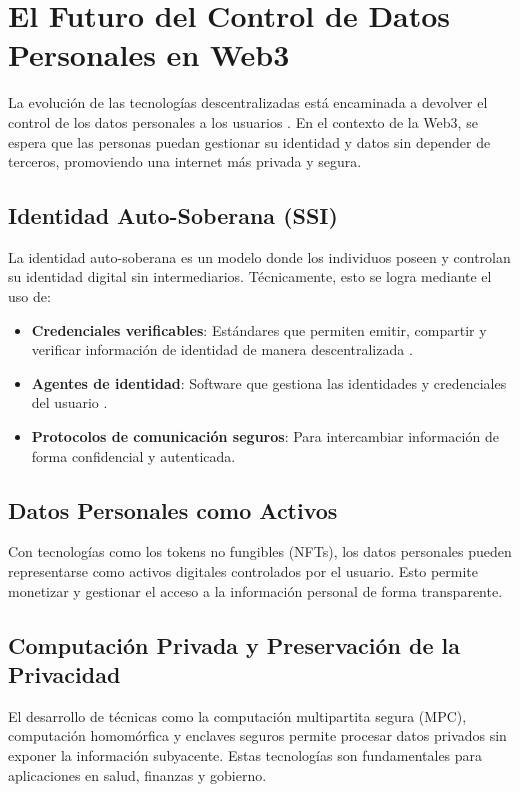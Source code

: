 \section{El Futuro del Control de Datos Personales en Web3}

La evolución de las tecnologías descentralizadas está encaminada a devolver el control de los datos personales a los usuarios \cite{w3cverifiable}. En el contexto de la Web3, se espera que las personas puedan gestionar su identidad y datos sin depender de terceros, promoviendo una internet más privada y segura.

\subsection{Identidad Auto-Soberana (SSI)}

La identidad auto-soberana es un modelo donde los individuos poseen y controlan su identidad digital sin intermediarios. Técnicamente, esto se logra mediante el uso de:

\begin{itemize}
    \item \textbf{Credenciales verificables}: Estándares que permiten emitir, compartir y verificar información de identidad de manera descentralizada \cite{w3cverifiable}.
    \item \textbf{Agentes de identidad}: Software que gestiona las identidades y credenciales del usuario \cite{preukschat2020self}.
    \item \textbf{Protocolos de comunicación seguros}: Para intercambiar información de forma confidencial y autenticada.
\end{itemize}

\subsection{Datos Personales como Activos}

Con tecnologías como los tokens no fungibles (NFTs), los datos personales pueden representarse como activos digitales controlados por el usuario. Esto permite monetizar y gestionar el acceso a la información personal de forma transparente.

\subsection{Computación Privada y Preservación de la Privacidad}

El desarrollo de técnicas como la computación multipartita segura (MPC), computación homomórfica y enclaves seguros permite procesar datos privados sin exponer la información subyacente. Estas tecnologías son fundamentales para aplicaciones en salud, finanzas y gobierno.

